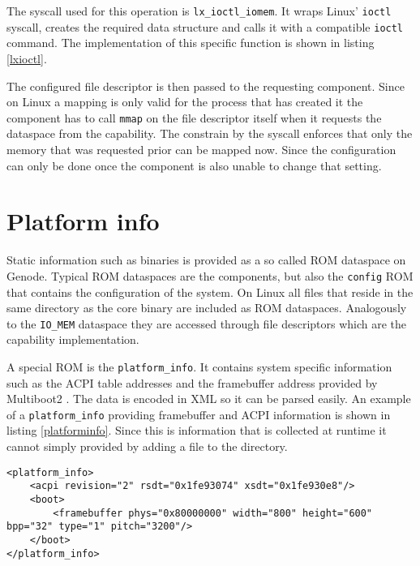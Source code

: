 \documentclass[
a4paper,
12pt,
notitlepage,
parskip=half,
DIV=11,
]{scrbook}
\begin{document}
		The syscall used for this operation is \texttt{lx\_ioctl\_iomem}.
		It wraps Linux' \texttt{ioctl} syscall, creates the required data structure and calls it with a compatible \texttt{ioctl} command.
		The implementation of this specific function is shown in listing \ref{lxioctl}.
		
		The configured file descriptor is then passed to the requesting component.
		Since on Linux a mapping is only valid for the process that has created it the component has to call \texttt{mmap} on the file descriptor itself when it requests the dataspace from the capability.
		The constrain by the syscall enforces that only the memory that was requested prior can be mapped now.
		Since the configuration can only be done once the component is also unable to change that setting.
		
		\section{Platform info}
		\label{pinfo}
		
		Static information such as binaries is provided as a so called ROM dataspace on Genode.
		Typical ROM dataspaces are the components, but also the \texttt{config} ROM that contains the configuration of the system.
		On Linux all files that reside in the same directory as the core binary are included as ROM dataspaces.
		Analogously to the \texttt{IO\_MEM} dataspace they are accessed through file descriptors which are the capability implementation.
		
		A special ROM is the \texttt{platform\_info}.
		It contains system specific information such as the ACPI \citep{acpi_spec} table addresses and the framebuffer address provided by Multiboot2 \citep{multiboot2}.
		The data is encoded in XML so it can be parsed easily.
		An example of a \texttt{platform\_info} providing framebuffer and ACPI information is shown in listing \ref{platforminfo}.
		Since this is information that is collected at runtime it cannot simply provided by adding a file to the directory.
		
		\begin{lstlisting}[basicstyle=\ttfamily\footnotesize]
<platform_info>
	<acpi revision="2" rsdt="0x1fe93074" xsdt="0x1fe930e8"/>
	<boot>
		<framebuffer phys="0x80000000" width="800" height="600" bpp="32" type="1" pitch="3200"/>
	</boot>
</platform_info>
		\end{lstlisting}
		
\end{document}
